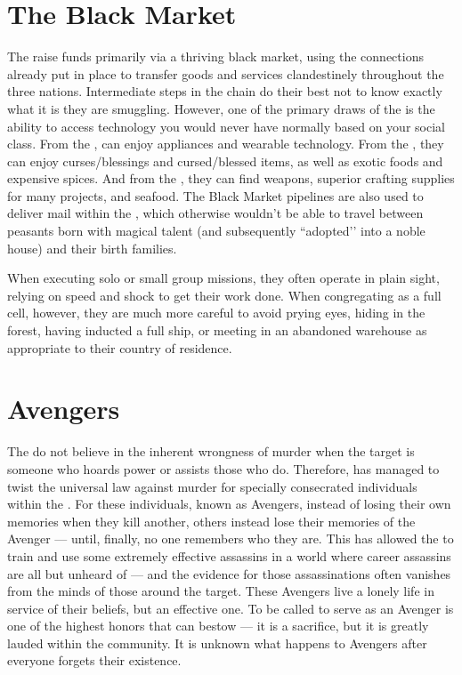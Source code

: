 \documentclass[blue]{GL2020}
\begin{document}
\section*{The Black Market}
The \pGoaties{} raise funds primarily via a thriving black market, using the connections already put in place to transfer goods and services clandestinely throughout the three nations. Intermediate steps in the chain do their best not to know exactly what it is they are smuggling. However, one of the primary draws of the \pGoaties{} is the ability to access technology you would never have normally based on your social class. From the \pTech{}, \pGoaties{} can enjoy appliances and wearable technology. From the \pFarm{}, they can enjoy curses/blessings and cursed/blessed items, as well as exotic foods and expensive spices. And from the \pShip{}, they can find weapons, superior crafting supplies for many projects, and seafood. The Black Market pipelines are also used to deliver mail within the \pFarm{}, which otherwise wouldn't be able to travel between peasants born with magical talent (and subsequently ``adopted'’ into a noble house) and their birth families.

When executing solo or small group missions, they often operate in plain sight, relying on speed and shock to get their work done. When congregating as a full cell, however, they are much more careful to avoid prying eyes, hiding in the forest, having inducted a full ship, or meeting in an abandoned warehouse as appropriate to their country of residence.

\section*{Avengers}
The \pGoaties{} do not believe in the inherent wrongness of murder when the target is someone who hoards power or assists those who do. Therefore, \cGenesis{} has managed to twist the universal law against murder for specially consecrated individuals within the \pGoaties{}. For these individuals, known as Avengers, instead of losing their own memories when they kill another, others instead lose their memories of the Avenger — until, finally, no one remembers who they are. This has allowed the \pGoaties{} to train and use some extremely effective assassins in a world where career assassins are all but unheard of — and the evidence for those assassinations often vanishes from the minds of those around the target. These Avengers live a lonely life in service of their beliefs, but an effective one. To be called to serve as an Avenger is one of the highest honors that \cGenesis{} can bestow — it is a sacrifice, but it is greatly lauded within the community. It is unknown what happens to Avengers after everyone forgets their existence.
\end{document}
